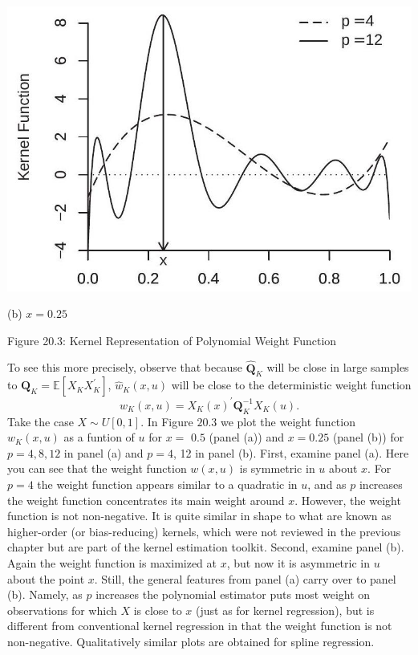 \documentclass[10pt]{article}
\begin{document}
\includegraphics[max width=\textwidth]{2022_10_23_2b38d6d54e7725c196e7g-08(1)}

(b) $x=0.25$

Figure 20.3: Kernel Representation of Polynomial Weight Function

To see this more precisely, observe that because $\widehat{\boldsymbol{Q}}_{K}$ will be close in large samples to $\boldsymbol{Q}_{K}=\mathbb{E}\left[X_{K} X_{K}^{\prime}\right]$, $\widehat{w}_{K}(x, u)$ will be close to the deterministic weight function
$$
w_{K}(x, u)=X_{K}(x)^{\prime} \boldsymbol{Q}_{K}^{-1} X_{K}(u) .
$$
Take the case $X \sim U[0,1]$. In Figure $20.3$ we plot the weight function $w_{K}(x, u)$ as a funtion of $u$ for $x=$ $0.5$ (panel (a)) and $x=0.25$ (panel (b)) for $p=4,8,12$ in panel (a) and $p=4$, 12 in panel (b). First, examine panel (a). Here you can see that the weight function $w(x, u)$ is symmetric in $u$ about $x$. For $p=4$ the weight function appears similar to a quadratic in $u$, and as $p$ increases the weight function concentrates its main weight around $x$. However, the weight function is not non-negative. It is quite similar in shape to what are known as higher-order (or bias-reducing) kernels, which were not reviewed in the previous chapter but are part of the kernel estimation toolkit. Second, examine panel (b). Again the weight function is maximized at $x$, but now it is asymmetric in $u$ about the point $x$. Still, the general features from panel (a) carry over to panel (b). Namely, as $p$ increases the polynomial estimator puts most weight on observations for which $X$ is close to $x$ (just as for kernel regression), but is different from conventional kernel regression in that the weight function is not non-negative. Qualitatively similar plots are obtained for spline regression.
\end{document}
